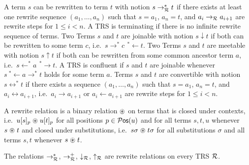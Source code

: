 %
\begin{definition}
	A term $s$ can be rewritten to term $t$ with notion $s\rightarrow^*_{\mathcal R} t$ 
	if there exists at least one {\myem rewrite sequence} $(a_1,\ldots ,a_n)$ such that
	$s=a_1$, $a_n=t$, and $a_i\rightarrow_{\mathcal R} a_{i+1}$ are rewrite steps for $1\leq i<n$.
	A TRS is {\myem terminating} if there is no infinite rewrite sequence of terms.
	Two Terms $s$ and $t$ are {\myem joinable} with notion $s\downarrow t$ 
	if both can be rewritten to some term $c$, i.e.~$s \rightarrow^*c\ \, ^*\!\!\leftarrow t$.
%	
	Two Terms $s$ and $t$ are {\myem meetable} with notion $s\uparrow t$ 
	if both can be rewritten from some common ancestor term $a$, i.e.~$s \leftarrow^*a\ \, ^*\!\!\rightarrow t$.
%
	A TRS is {\myem confluent } if $s$ and $t$ are joinable whenever $s\ ^*\!\!\leftarrow a \rightarrow^* t$ holds for some term $a$.
	Terms $s$ and $t$ are {\myem convertible} with notion $s\leftrightarrow^* t$ 
	if there exists a sequence $(a_1,\ldots ,a_n)$ such that
	$s=a_1$, $a_n=t$, and $a_i\leftrightarrow a_{i+1}$, i.e.~$a_i\rightarrow a_{i+1}$ or $a_i\leftarrow a_{i+1}$ are rewrite steps for $1\leq i<n$.
\end{definition}
%
\begin{definition}\label{def:closed-under}
	A {\myem rewrite relation} is a binary relation $\mathrel{\circledast}$ on terms that is {\myem closed under contexts},
	i.e.~$u[s]_p\mathrel{\circledast} u[t]_p$ %
	for all positions $p\in\operatorname{\mathcal{P}\mathsf{os}}(u)$ and
	for all terms $s,t,u$ whenever $s\mathrel{\circledast} t$
	and {\myem closed under substitutions}, 
	i.e.~$s\sigma\mathrel{\circledast} t\sigma$ %
	for all substitutions $\sigma$
	and all terms $s,t$ whenever $s\mathrel{\circledast} t$.
\end{definition}
\begin{lemma}
	The relations $\rightarrow^*_{\mathcal R}$, 
	$\rightarrow^+_{\mathcal R}$,
	$\downarrow_{\mathcal R}$, $\uparrow_{\mathcal R}$ are rewrite relations on every TRS ${\mathcal R}$.
\end{lemma}



